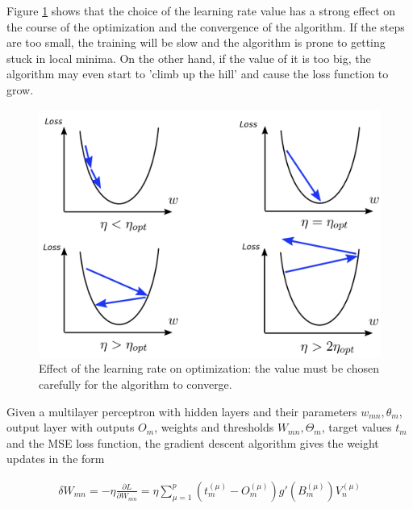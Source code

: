 Figure \ref{learning_rate} shows that the choice of the learning rate value has a strong effect on the course of the optimization and the convergence of the algorithm. If the steps are too small, the training will be slow and the algorithm is prone to getting stuck in local minima. On the other hand, if the value of it is too big, the algorithm may even start to 'climb up the hill' and cause the loss function to grow. \cite{mehlig} 

\newpage

\vspace{3mm}
\begin{figure}[htb]
	\begin{center}
		\includegraphics*[width=14cm, keepaspectratio]{obr/learning_rate.png}
	\end{center}
	\vspace{3mm}
	\caption{Effect of the learning rate on optimization: the value must be chosen carefully for the algorithm to converge. \cite{coors}} 
	\label{learning_rate}
\end{figure}

Given a multilayer perceptron with hidden layers and their parameters $ w_{mn}, \theta_m $, output layer with outputs $ O_{m} $, weights and thresholds $ W_{mn}, \Theta_m $, target values $ t_{m} $ and the MSE loss function, the gradient descent algorithm gives the weight updates in the form \cite{mehlig}

\begin{gather}
	\delta W_{mn} = - \eta \frac{\partial L}{\partial W_{mn}} = \eta \sum\limits_{\mu=1}^{p}
	(t_{m}^{(\mu)} - O_{m}^{(\mu)})   g'(B_{m}^{(\mu)})     V_{n}^{(\mu)}
\end{gather}

